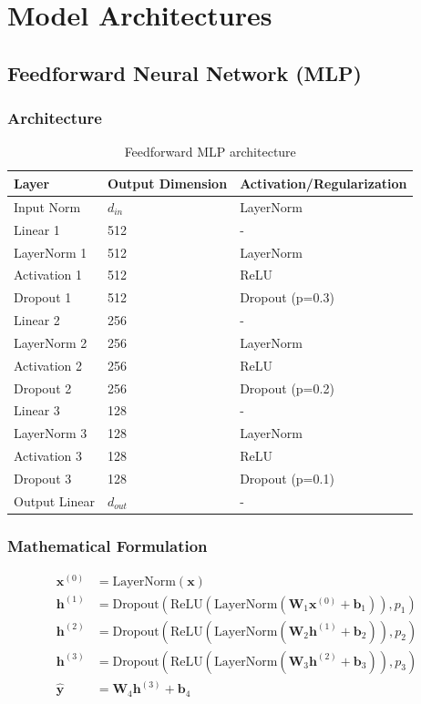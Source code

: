 \documentclass[12pt,a4paper]{article}
\begin{document}
\section{Model Architectures}

\subsection{Feedforward Neural Network (MLP)}

\subsubsection{Architecture}
\begin{table}[H]
\centering
\begin{tabular}{lll}
\toprule
\textbf{Layer} & \textbf{Output Dimension} & \textbf{Activation/Regularization} \\
\midrule
Input Norm & $d_{in}$ & LayerNorm \\
Linear 1 & 512 & - \\
LayerNorm 1 & 512 & LayerNorm \\
Activation 1 & 512 & ReLU \\
Dropout 1 & 512 & Dropout (p=0.3) \\
\midrule
Linear 2 & 256 & - \\
LayerNorm 2 & 256 & LayerNorm \\
Activation 2 & 256 & ReLU \\
Dropout 2 & 256 & Dropout (p=0.2) \\
\midrule
Linear 3 & 128 & - \\
LayerNorm 3 & 128 & LayerNorm \\
Activation 3 & 128 & ReLU \\
Dropout 3 & 128 & Dropout (p=0.1) \\
\midrule
Output Linear & $d_{out}$ & - \\
\bottomrule
\end{tabular}
\caption{Feedforward MLP architecture}
\end{table}

\subsubsection{Mathematical Formulation}
\begin{align}
    \mathbf{x}^{(0)} &= \text{LayerNorm}(\mathbf{x}) \\
    \mathbf{h}^{(1)} &= \text{Dropout}(\text{ReLU}(\text{LayerNorm}(\mathbf{W}_1 \mathbf{x}^{(0)} + \mathbf{b}_1)), p_1) \\
    \mathbf{h}^{(2)} &= \text{Dropout}(\text{ReLU}(\text{LayerNorm}(\mathbf{W}_2 \mathbf{h}^{(1)} + \mathbf{b}_2)), p_2) \\
    \mathbf{h}^{(3)} &= \text{Dropout}(\text{ReLU}(\text{LayerNorm}(\mathbf{W}_3 \mathbf{h}^{(2)} + \mathbf{b}_3)), p_3) \\
    \hat{\mathbf{y}} &= \mathbf{W}_4 \mathbf{h}^{(3)} + \mathbf{b}_4
\end{align}
\end{document}
